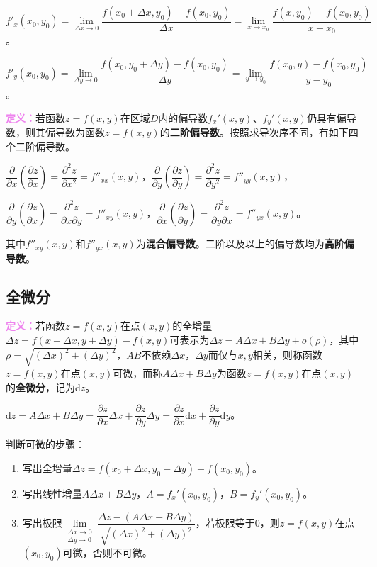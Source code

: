 \documentclass[UTF8, 12pt]{ctexart}
\begin{document}
        $f'_x(x_0,y_0)=\lim\limits_{\Delta x\to0}\dfrac{f(x_0+\Delta x,y_0)-f(x_0,y_0)}{\Delta x}=\lim\limits_{x\to x_0}\dfrac{f(x,y_0)-f(x_0,y_0)}{x-x_0}$。

        $f'_y(x_0,y_0)=\lim\limits_{\Delta y\to0}\dfrac{f(x_0,y_0+\Delta y)-f(x_0,y_0)}{\Delta y}=\lim\limits_{y\to y_0}\dfrac{f(x_0,y)-f(x_0,y_0)}{y-y_0}$。

        \textcolor{violet}{\textbf{定义：}}若函数$z=f(x,y)$在区域$D$内的偏导数$f_x'(x,y)$、$f_y'(x,y)$仍具有偏导数，则其偏导数为函数$z=f(x,y)$的\textbf{二阶偏导数}。按照求导次序不同，有如下四个二阶偏导数。

        $\dfrac{\partial}{\partial x}\left(\dfrac{\partial z}{\partial x}\right)=\dfrac{\partial^2z}{\partial x^2}=f''_{xx}(x,y)$，$\dfrac{\partial}{\partial y}\left(\dfrac{\partial z}{\partial y}\right)=\dfrac{\partial^2z}{\partial y^2}=f''_{yy}(x,y)$，

        $\dfrac{\partial}{\partial y}\left(\dfrac{\partial z}{\partial x}\right)=\dfrac{\partial^2z}{\partial x\partial y}=f''_{xy}(x,y)$，$\dfrac{\partial}{\partial x}\left(\dfrac{\partial z}{\partial y}\right)=\dfrac{\partial^2z}{\partial y\partial x}=f''_{yx}(x,y)$。

        其中$f''_{xy}(x,y)$和$f''_{yx}(x,y)$为\textbf{混合偏导数}。二阶以及以上的偏导数均为\textbf{高阶偏导数}。

        \subsection{全微分}

        \textcolor{violet}{\textbf{定义：}}若函数$z=f(x,y)$在点$(x,y)$的全增量$\Delta z=f(x+\Delta x,y+\Delta y)-f(x,y)$可表示为$\Delta z=A\Delta x+B\Delta y+o(\rho)$，其中$\rho=\sqrt{(\Delta x)^2+(\Delta y)^2}$，$AB$不依赖$\Delta x$，$\Delta y$而仅与$x,y$相关，则称函数$z=f(x,y)$在点$(x,y)$可微，而称$A\Delta x+B\Delta y$为函数$z=f(x,y)$在点$(x,y)$的\textbf{全微分}，记为$\textrm{d}z$。

        $\textrm{d}z=A\Delta x+B\Delta y=\dfrac{\partial z}{\partial x}\Delta x+\dfrac{\partial z}{\partial y}\Delta y=\dfrac{\partial z}{\partial x}\textrm{d}x+\dfrac{\partial z}{\partial y}\textrm{d}y$。

        判断可微的步骤：

        \begin{enumerate}
            \item 写出全增量$\Delta z=f(x_0+\Delta x,y_0+\Delta y)-f(x_0,y_0)$。
            \item 写出线性增量$A\Delta x+B\Delta y$，$A=f_x'(x_0,y_0)$，$B=f_y'(x_0,y_0)$。
            \item 写出极限$\lim\limits_{\substack{\Delta x\to0\\\Delta y\to0}}\dfrac{\Delta z-(A\Delta x+B\Delta y)}{\sqrt{(\Delta x)^2+(\Delta y)^2}}$，若极限等于0，则$z=f(x,y)$在点$(x_0,y_0)$可微，否则不可微。
        \end{enumerate}
\end{document}
